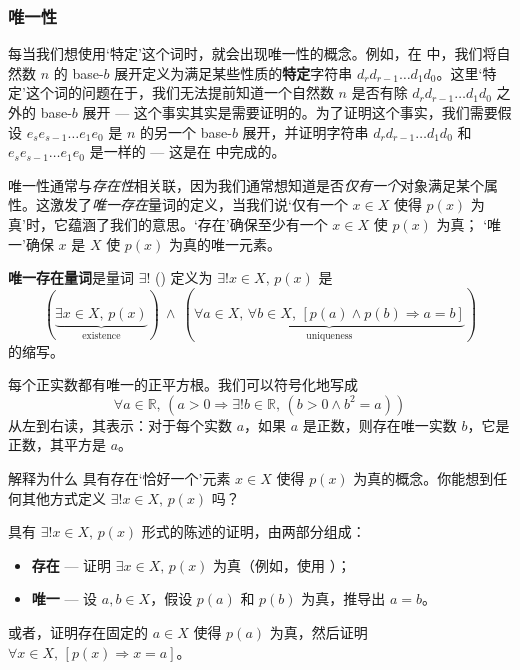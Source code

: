 \subsubsection*{唯一性}

每当我们想使用`特定'这个词时，就会出现唯一性的概念。例如，在  中，我们将自然数 $n$ 的 base-$b$ 展开定义为满足某些性质的\textbf{特定}字符串 $d_r d_{r-1} \dots d_1 d_0$。这里`特定'这个词的问题在于，我们无法提前知道一个自然数 $n$ 是否有除 $d_r d_{r-1} \dots d_1 d_0$ 之外的 base-$b$ 展开 --- 这个事实其实是需要证明的。为了证明这个事实，我们需要假设 $e_s e_{s-1} \dots e_1 e_0$ 是 $n$ 的另一个 base-$b$ 展开，并证明字符串 $d_r d_{r-1} \dots d_1 d_0$ 和 $e_s e_{s-1} \dots e_1 e_0$ 是一样的 --- 这是在  中完成的。

唯一性通常与\textit{存在性}相关联，因为我们通常想知道是否\textit{仅有一个}对象满足某个属性。这激发了\textit{唯一存在}量词的定义，当我们说`仅有一个 $x \in X$ 使得 $p(x)$ 为真'时，它蕴涵了我们的意思。`存在'确保至少有一个 $x \in X$ 使 $p(x)$ 为真； `唯一'确保 $x$ 是 $X$ 使 $p(x)$ 为真的唯一元素。

\begin{definition}
\label{defUniqueExistentialQuantifier}
\textbf{唯一存在量词}是量词 $\exists !$ (\lindexmmc{\exists!}{$\exists!$}) 定义为 $\exists ! x \in X,\, p(x)$ 是 \[(\underbrace{\exists x \in X,\, p(x)}_{\text{existence}}) ~ \wedge ~ (\underbrace{\forall a \in X,\, \forall b \in X,\, [p(a) \wedge p(b) \Rightarrow a=b]}_{\text{uniqueness}})\] 的缩写。
\end{definition}

\begin{example}
\label{exEveryPositiveRealHasUniqueSquareRoot}
每个正实数都有唯一的正平方根。我们可以符号化地写成
\[\forall a \in \mathbb{R},\, (a > 0 \Rightarrow \exists !b \in \mathbb{R},\, (b > 0 \wedge b^2=a))\]
从左到右读，其表示：对于每个实数 $a$，如果 $a$ 是正数，则存在唯一实数 $b$，它是正数，其平方是 $a$。
\end{example}

\begin{discussion}
解释为什么  具有存在`恰好一个'元素 $x \in X$ 使得 $p(x)$ 为真的概念。你能想到任何其他方式定义 $\exists ! x \in X,\, p(x)$ 吗？
\end{discussion}

\begin{strategy}[唯一存在量化陈述证明]
具有 $\exists ! x \in X,\, p(x)$ 形式的陈述的证明，由两部分组成：
\begin{itemize}
\item \textbf{存在} --- 证明 $\exists x \in X,\, p(x)$ 为真（例如，使用 ）；
\item \textbf{唯一} --- 设 $a,b \in X$，假设 $p(a)$ 和 $p(b)$ 为真，推导出 $a=b$。
\end{itemize}
或者，证明存在固定的 $a \in X$ 使得 $p(a)$ 为真，然后证明 $\forall x \in X,\, [p(x) \Rightarrow x=a]$。
\end{strategy}

